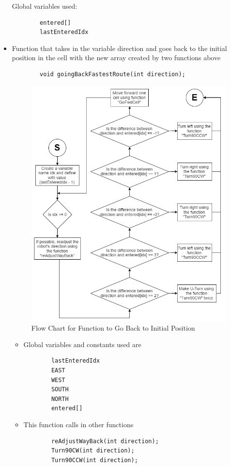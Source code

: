 \documentclass[11pt]{article}
\begin{document}
\begin{itemize}
Global variables used:
 	\begin{verbatim}
		entered[]
		lastEnteredIdx
	\end{verbatim}
	
\item Function that takes in the variable direction and goes back to the initial position in the cell with the new array created by two functions above
 	\begin{verbatim}
		void goingBackFastestRoute(int direction);
	\end{verbatim}
\begin{figure}[htp]
\centering
\includegraphics[scale=0.53]{images/Software_Flowchart/goingBackFastestRoute.png}
\caption{Flow Chart for Function to Go Back to Initial Position}
\label{}
\end{figure}
	\begin{itemize}
	\item Global variables and constants used are
	\begin{verbatim}
		lastEnteredIdx
		EAST
		WEST
		SOUTH
		NORTH
		entered[]
	\end{verbatim}
	\item This function calls in other functions
	\begin{verbatim}
		reAdjustWayBack(int direction);	
		Turn90CW(int direction);
		Turn90CCW(int direction);
	\end{verbatim}
	\end{itemize}
\end{itemize}
\newpage
\end{document}
